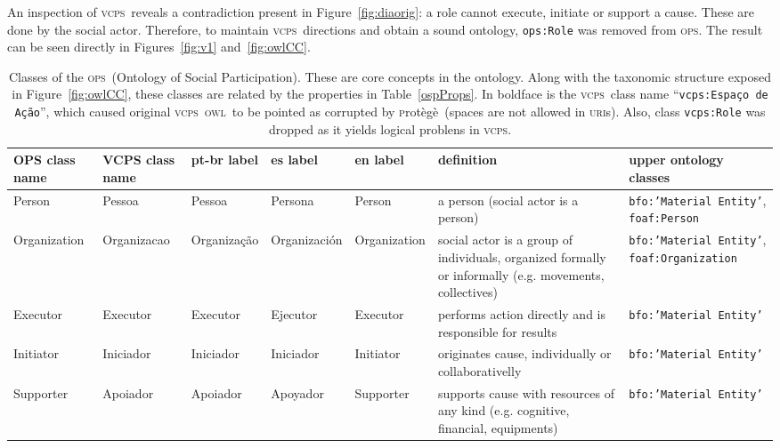 \documentclass[10pt,letterpaper]{article}
\newcommand{\ops}{\textsc{ops}}
\newcommand{\vcps}{\textsc{vcps}}
\newcommand{\owl}{\textsc{owl}}
\newcommand{\uri}{\textsc{uri}}
\newcommand{\protege}{\textsc{p}rot\`eg\`e}
\begin{document}
An inspection of \vcps\ reveals a contradiction present in Figure~\ref{fig:diaorig}:
a role cannot execute, initiate or support a cause.
These are done by the social actor.
Therefore, to maintain \vcps\ directions and obtain a sound ontology,
{\tt ops:Role} was removed from \ops.
The result can be seen directly in Figures~\ref{fig:v1} and~\ref{fig:owlCC}.

\begin{table}[!h]
\begin{adjustwidth}{-2.25in}{0in} %
    \footnotesize
  \centering
  \caption{Classes of the \ops\ (Ontology of Social Participation).
  These are core concepts in the ontology.
  Along with the taxonomic structure exposed in Figure~\ref{fig:owlCC},
  these classes are related by the properties in Table~\ref{ospProps}.
  In boldface is the \vcps\ class name ``{\tt vcps:Espa\c{c}o de A\c{c}\~ao}'',
  which caused original \vcps\ \owl\ to be pointed as corrupted by \protege\ (spaces are not allowed in \uri s).
  Also, class {\tt vcps:Role} was dropped as it yields logical problens in \vcps.}
  \begin{tabular}{|p{1.8cm}|p{1.6cm}||p{2.2cm}|p{2.2cm}|p{1.8cm}||p{4cm}||p{3cm}|}\hline
      {\bf OPS class name} & {\bf VCPS class name} & {\bf pt-br label} & {\bf es label} & {\bf en label} & {\bf definition} & {\bf upper ontology classes} \\\hline\hline
      Person & Pessoa & Pessoa & Persona & Person & a person (social actor is a person) & {\tt bfo:'Material Entity'}, {\tt foaf:Person} \\ \hline
      Organization & Organizacao & Organiza\c{c}\~ao & Organizaci\'on & Organization & social actor is a group of individuals, organized formally or informally (e.g. movements, collectives) & {\tt bfo:'Material Entity'}, {\tt foaf:Organization} \\ \hline \hline
Executor & Executor & Executor & Ejecutor & Executor & performs action directly and is responsible for results & {\tt bfo:'Material Entity'} \\ \hline
Initiator & Iniciador & Iniciador & Iniciador & Initiator & originates cause, individually or collaborativelly & {\tt bfo:'Material Entity'} \\ \hline
      Supporter & Apoiador & Apoiador & Apoyador & Supporter & supports cause with resources of any kind (e.g. cognitive, financial, equipments) & {\tt bfo:'Material Entity'} \\ \hline

\end{tabular}
\end{adjustwidth}
\end{table}
\end{document}
